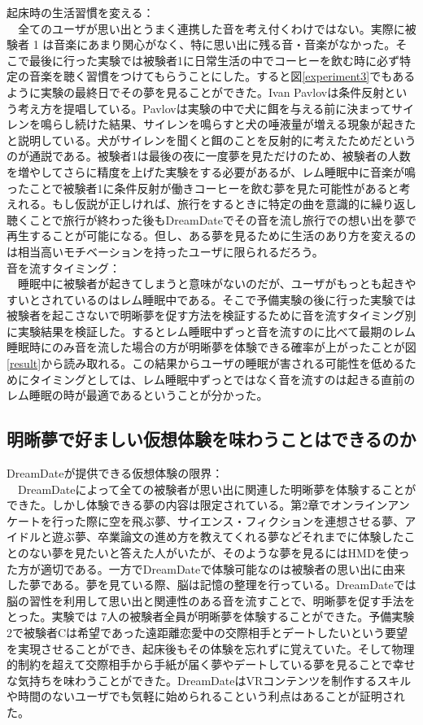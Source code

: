 起床時の生活習慣を変える：\\
　全てのユーザが思い出とうまく連携した音を考え付くわけではない。実際に被験者 1 は音楽にあまり関心がなく、特に思い出に残る音・音楽がなかった。そこで最後に行った実験では被験者1に日常生活の中でコーヒーを飲む時に必ず特定の音楽を聴く習慣をつけてもらうことにした。すると図\ref{experiment3}でもあるように実験の最終日でその夢を見ることができた。Ivan Pavlovは条件反射という考え方を提唱している\cite{pavlov}。Pavlovは実験の中で犬に餌を与える前に決まってサイレンを鳴らし続けた結果、サイレンを鳴らすと犬の唾液量が増える現象が起きたと説明している。犬がサイレンを聞くと餌のことを反射的に考えたためだというのが通説である。被験者1は最後の夜に一度夢を見ただけのため、被験者の人数を増やしてさらに精度を上げた実験をする必要があるが、レム睡眠中に音楽が鳴ったことで被験者1に条件反射が働きコーヒーを飲む夢を見た可能性があると考えれる。もし仮説が正しければ、旅行をするときに特定の曲を意識的に繰り返し聴くことで旅行が終わった後もDreamDateでその音を流し旅行での想い出を夢で再生することが可能になる。但し、ある夢を見るために生活のあり方を変えるのは相当高いモチベーションを持ったユーザに限られるだろう。\\

音を流すタイミング：\\
　睡眠中に被験者が起きてしまうと意味がないのだが、ユーザがもっとも起きやすいとされているのはレム睡眠中である\cite{レムノンレム}。そこで予備実験の後に行った実験では被験者を起こさないで明晰夢を促す方法を検証するために音を流すタイミング別に実験結果を検証した。するとレム睡眠中ずっと音を流すのに比べて最期のレム睡眠時にのみ音を流した場合の方が明晰夢を体験できる確率が上がったことが図\ref{result}から読み取れる。この結果からユーザの睡眠が害される可能性を低めるためにタイミングとしては、レム睡眠中ずっとではなく音を流すのは起きる直前のレム睡眠の時が最適であるということが分かった。

\subsection{明晰夢で好ましい仮想体験を味わうことはできるのか} 
DreamDateが提供できる仮想体験の限界：\\
　DreamDateによって全ての被験者が思い出に関連した明晰夢を体験することができた。しかし体験できる夢の内容は限定されている。第2章でオンラインアンケートを行った際に空を飛ぶ夢、サイエンス・フィクションを連想させる夢、アイドルと遊ぶ夢、卒業論文の進め方を教えてくれる夢などそれまでに体験したことのない夢を見たいと答えた人がいたが、そのような夢を見るにはHMDを使った方が適切である。一方でDreamDateで体験可能なのは被験者の思い出に由来した夢である。夢を見ている際、脳は記憶の整理を行っている\cite{Zhang}。DreamDateでは脳の習性を利用して思い出と関連性のある音を流すことで、明晰夢を促す手法をとった。実験では 7人の被験者全員が明晰夢を体験することができた。予備実験2で被験者Cは希望であった遠距離恋愛中の交際相手とデートしたいという要望を実現させることができ、起床後もその体験を忘れずに覚えていた。そして物理的制約を超えて交際相手から手紙が届く夢やデートしている夢を見ることで幸せな気持ちを味わうことができた。DreamDateはVRコンテンツを制作するスキルや時間のないユーザでも気軽に始められるこという利点はあることが証明された。

